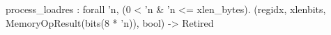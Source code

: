 process_loadres : forall 'n, (0 < 'n & 'n <= xlen_bytes).
  (regidx, xlenbits, MemoryOpResult(bits(8 * 'n)), bool) -> Retired